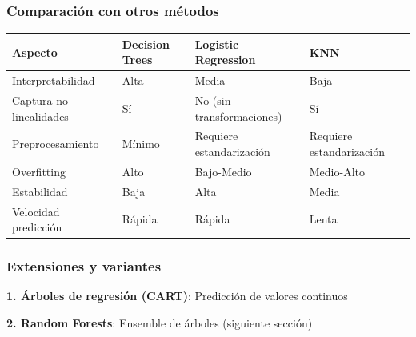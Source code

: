 \documentclass[
  doc,
  floatsintext,
  longtable,
  a4paper,
  nolmodern,
  notxfonts,
  notimes,
  12pt,
  colorlinks=true,linkcolor=blue,citecolor=blue,urlcolor=blue]{apa7}
\newcounter{none} %
\begin{document}
\subsubsection{Comparación con otros
métodos}\label{comparaciuxf3n-con-otros-muxe9todos}

{\def\LTcaptype{none} %
\begin{longtable}[]{@{}
  >{\raggedright\arraybackslash}p{}
  >{\raggedright\arraybackslash}p{}
  >{\raggedright\arraybackslash}p{}
  >{\raggedright\arraybackslash}p{}@{}}
\toprule\noalign{}
\begin{minipage}[b]{\linewidth}\raggedright
Aspecto
\end{minipage} & \begin{minipage}[b]{\linewidth}\raggedright
Decision Trees
\end{minipage} & \begin{minipage}[b]{\linewidth}\raggedright
Logistic Regression
\end{minipage} & \begin{minipage}[b]{\linewidth}\raggedright
KNN
\end{minipage} \\
\midrule\noalign{}
\endhead
\bottomrule\noalign{}
\endlastfoot
Interpretabilidad & Alta & Media & Baja \\
Captura no linealidades & Sí & No (sin transformaciones) & Sí \\
Preprocesamiento & Mínimo & Requiere estandarización & Requiere
estandarización \\
Overfitting & Alto & Bajo-Medio & Medio-Alto \\
Estabilidad & Baja & Alta & Media \\
Velocidad predicción & Rápida & Rápida & Lenta \\
\end{longtable}
}

\subsubsection{Extensiones y variantes}\label{extensiones-y-variantes-1}

\textbf{1. Árboles de regresión (CART)}: Predicción de valores continuos

\textbf{2. Random Forests}: Ensemble de árboles (siguiente sección)
\end{document}
